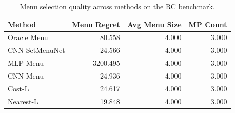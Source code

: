 \begin{table}[t]
\centering
\small
\setlength{\tabcolsep}{4pt}
\caption{Menu selection quality across methods on the RC benchmark.}
\label{tab:work2_main_menu_regret}
\begin{tabular}{@{}lrrr@{}}
\hline
Method & Menu Regret & Avg Menu Size & MP Count \\
\hline
Oracle Menu & 80.558 & 4.000 & 3.000 \\
CNN-SetMenuNet & 24.566 & 4.000 & 3.000 \\
MLP-Menu & 3200.495 & 4.000 & 3.000 \\
CNN-Menu & 24.936 & 4.000 & 3.000 \\
Cost-L & 24.617 & 4.000 & 3.000 \\
Nearest-L & 19.848 & 4.000 & 3.000 \\
\hline
\end{tabular}
\end{table}
